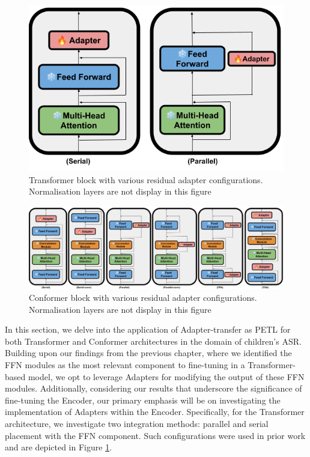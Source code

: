 \begin{figure}[t]
    \begin{center}
    \includegraphics[scale=0.27]{imgs/Adapter_Transformer.png}
    \caption{Transformer block with various residual adapter configurations. Normalisation layers are not display in this figure}
    \label{fig:transformer_config}
    \end{center}
\end{figure}
\begin{figure}[t]
    \begin{center}
    \includegraphics[scale=0.27]{imgs/Adapter_conformer.png}
    \caption{Conformer block with various residual adapter configurations. Normalisation layers are not display in this figure}
    \label{fig:conformer_config}
    \end{center}
\end{figure}

In this section, we delve into the application of Adapter-transfer as PETL for both Transformer and Conformer architectures in the domain of children's ASR. Building upon our findings from the previous chapter, where we identified the FFN modules as the most relevant component to fine-tuning in a Transformer-based model, we opt to leverage Adapters for modifying the output of these FFN modules. Additionally, considering our results that underscore the significance of fine-tuning the Encoder, our primary emphasis will be on investigating the implementation of Adapters within the Encoder. Specifically, for the Transformer architecture, we investigate two integration methods: parallel and serial placement with the FFN component. Such configurations were used in prior work \cite{he2021towards} and are depicted in Figure \ref{fig:transformer_config}.


